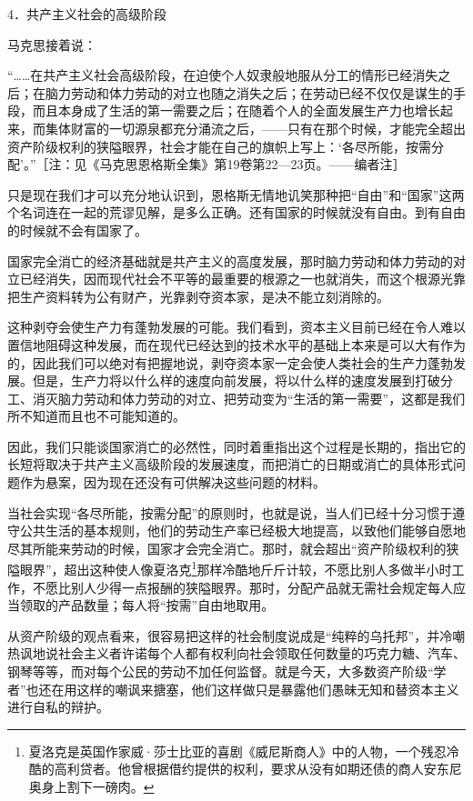 \documentclass[UTF8, 12pt, a4paper]{ctexrep}
\begin{document}
4．共产主义社会的高级阶段

马克思接着说：

“……在共产主义社会高级阶段，在迫使个人奴隶般地服从分工的情形已经消失之后；在脑力劳动和体力劳动的对立也随之消失之后；在劳动已经不仅仅是谋生的手段，而且本身成了生活的第一需要之后；在随着个人的全面发展生产力也增长起来，而集体财富的一切源泉都充分涌流之后，——只有在那个时候，才能完全超出资产阶级权利的狭隘眼界，社会才能在自己的旗帜上写上：‘各尽所能，按需分配’。”［注：见《马克思恩格斯全集》第19卷第22—23页。——编者注］

只是现在我们才可以充分地认识到，恩格斯无情地讥笑那种把“自由”和“国家”这两个名词连在一起的荒谬见解，是多么正确。还有国家的时候就没有自由。到有自由的时候就不会有国家了。

国家完全消亡的经济基础就是共产主义的高度发展，那时脑力劳动和体力劳动的对立已经消失，因而现代社会不平等的最重要的根源之一也就消失，而这个根源光靠把生产资料转为公有财产，光靠剥夺资本家，是决不能立刻消除的。

这种剥夺会使生产力有蓬勃发展的可能。我们看到，资本主义目前已经在令人难以置信地阻碍这种发展，而在现代已经达到的技术水平的基础上本来是可以大有作为的，因此我们可以绝对有把握地说，剥夺资本家一定会使人类社会的生产力蓬勃发展。但是，生产力将以什么样的速度向前发展，将以什么样的速度发展到打破分工、消灭脑力劳动和体力劳动的对立、把劳动变为“生活的第一需要”，这都是我们所不知道而且也不可能知道的。

因此，我们只能谈国家消亡的必然性，同时着重指出这个过程是长期的，指出它的长短将取决于共产主义高级阶段的发展速度，而把消亡的日期或消亡的具体形式问题作为悬案，因为现在还没有可供解决这些问题的材料。

当社会实现“各尽所能，按需分配”的原则时，也就是说，当人们已经十分习惯于遵守公共生活的基本规则，他们的劳动生产率已经极大地提高，以致他们能够自愿地尽其所能来劳动的时候，国家才会完全消亡。那时，就会超出“资产阶级权利的狭隘眼界”，超出这种使人像夏洛克\footnote{夏洛克是英国作家威·莎士比亚的喜剧《威尼斯商人》中的人物，一个残忍冷酷的高利贷者。他曾根据借约提供的权利，要求从没有如期还债的商人安东尼奥身上割下一磅肉。}那样冷酷地斤斤计较，不愿比别人多做半小时工作，不愿比别人少得一点报酬的狭隘眼界。那时，分配产品就无需社会规定每人应当领取的产品数量；每人将“按需”自由地取用。

从资产阶级的观点看来，很容易把这样的社会制度说成是“纯粹的乌托邦”，并冷嘲热讽地说社会主义者许诺每个人都有权利向社会领取任何数量的巧克力糖、汽车、钢琴等等，而对每个公民的劳动不加任何监督。就是今天，大多数资产阶级“学者”也还在用这样的嘲讽来搪塞，他们这样做只是暴露他们愚昧无知和替资本主义进行自私的辩护。
\end{document}
